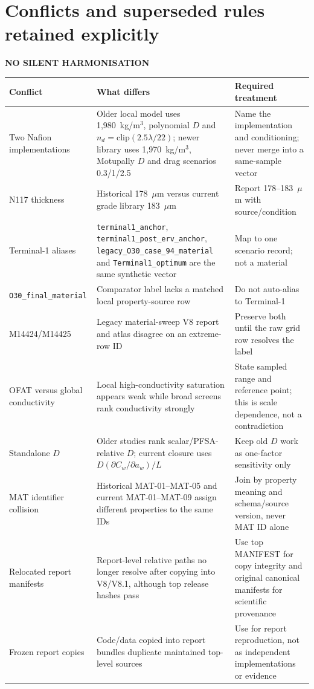 \documentclass[10pt,a4paper]{article}
\newcommand{\eyebrow}[1]{{\sffamily\bfseries\small\color{Teal}\MakeUppercase{#1}}}
\begin{document}
\section{Conflicts and superseded rules retained explicitly}
\eyebrow{No silent harmonisation}

\begin{center}\footnotesize
\begin{tabularx}{\textwidth}{@{}p{31mm}Y Y@{}}
\toprule
\textbf{Conflict} & \textbf{What differs} & \textbf{Required treatment} \\
\midrule
Two Nafion implementations & Older local model uses 1,980~kg/m$^3$, polynomial $D$ and $n_d=\mathrm{clip}(2.5\lambda/22)$; newer library uses 1,970~kg/m$^3$, Motupally $D$ and drag scenarios 0.3/1/2.5 & Name the implementation and conditioning; never merge into a same-sample vector \\
N117 thickness & Historical 178~$\mu$m versus current grade library 183~$\mu$m & Report 178--183~$\mu$m with source/condition \\
Terminal-1 aliases & \texttt{terminal1\_anchor}, \texttt{terminal1\_post\_erv\_anchor}, \texttt{legacy\_O30\_case\_94\_material} and \texttt{Terminal1\_optimum} are the same synthetic vector & Map to one scenario record; not a material \\
\texttt{O30\_final\_material} & Comparator label lacks a matched local property-source row & Do not auto-alias to Terminal-1 \\
M14424/M14425 & Legacy material-sweep V8 report and atlas disagree on an extreme-row ID & Preserve both until the raw grid row resolves the label \\
OFAT versus global conductivity & Local high-conductivity saturation appears weak while broad screens rank conductivity strongly & State sampled range and reference point; this is scale dependence, not a contradiction \\
Standalone $D$ & Older studies rank scalar/PFSA-relative $D$; current closure uses $D(\partial C_w/\partial a_w)/L$ & Keep old $D$ work as one-factor sensitivity only \\
MAT identifier collision & Historical MAT-01--MAT-05 and current MAT-01--MAT-09 assign different properties to the same IDs & Join by property meaning and schema/source version, never MAT ID alone \\
Relocated report manifests & Report-level relative paths no longer resolve after copying into V8/V8.1, although top release hashes pass & Use top MANIFEST for copy integrity and original canonical manifests for scientific provenance \\
Frozen report copies & Code/data copied into report bundles duplicate maintained top-level sources & Use for report reproduction, not as independent implementations or evidence \\
\bottomrule
\end{tabularx}
\end{center}
\end{document}
